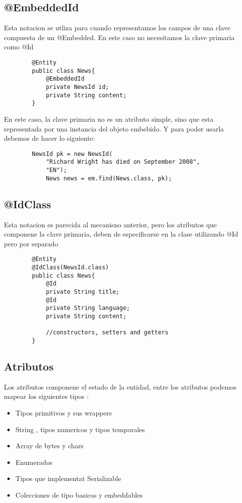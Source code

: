 \documentclass{article}
\begin{document}
\subsection*{@EmbeddedId}
Esta notacion se utliza para cuando representamos los campos de una clave compuesta de un @Embedded. En este caso no necesitamos la clave primaria como @Id
\begin{lstlisting}
        @Entity
        public class News{
            @EmbeddedId
            private NewsId id;
            private String content;
        }
    \end{lstlisting}

En este caso, la clave primaria no es un atributo simple, sino que esta representada por una instancia del objeto embebido. Y para poder usarla debemos de hacer lo siguiente:
\begin{lstlisting}
        NewsId pk = new NewsId( 
            "Richard Wright has died on September 2008",
            "EN");
            News news = em.find(News.class, pk);
    \end{lstlisting}

\subsection*{@IdClass}

Esta notacion es parecida al mecanisno anterior, pero los atributos que componene la clave primaria, deben de especificarse en la clase utilizando @Id pero por separado
\begin{lstlisting}
        @Entity
        @IdClass(NewsId.class)
        public class News{
            @Id
            private String title;
            @Id
            private String language;
            private String content;

            //constructors, setters and getters
        }
    \end{lstlisting}


\subsection*{Atributos}
Los atributos componene el estado de la entidad, entre los atributos podemos mapear los siguientes tipos :
\begin{itemize}
	\item Tipos primitivos y sus wrappers
	\item String , tipos numericos y tipos temporales
	\item Array de bytes y chars
	\item Enumerados
	\item Tipos que implementat Serializable
	\item Colecciones de tipo basicos y embeddables
\end{itemize}
\end{document}
